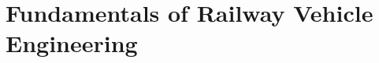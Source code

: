 \chapter{Fundamentals of Railway Vehicle Engineering}
\label{chap:FundamentalsOfRailwayVehicleEngineering}

